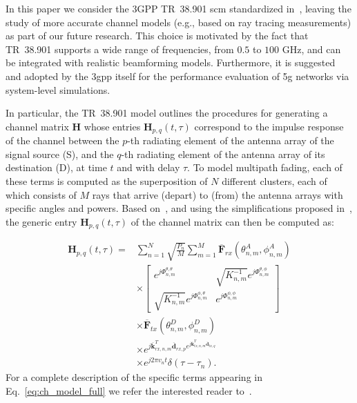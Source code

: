 In this paper we consider the 3GPP TR~38.901 \gls{scm} standardized in~\cite{3gpp.38.901}, leaving the study of more accurate channel models (e.g., based on ray tracing measurements) as part of our future research.
This choice is motivated by the fact that TR~38.901 supports a wide range of frequencies, from $0.5$ to $100$ GHz, and can be integrated with realistic beamforming models. Furthermore, it is suggested and adopted by the \gls{3gpp} itself for the performance evaluation of \gls{5g} networks via system-level simulations.

In particular, the TR~38.901 model outlines the procedures for generating a channel matrix $\bm{H}$ whose entries $\bm{H}_{p, q} (t, \tau)$ correspond to the impulse response of the channel between the $p$-th radiating element of the antenna array of the signal source (S), and the $q$-th radiating element of the antenna array of its destination (D), at time $t$ and with delay $\tau$. 
To model multipath fading, each of these terms is computed as the superposition of $N$ different clusters, each of which consists of $M$ rays that arrive (depart) to (from) the antenna arrays with specific angles and powers. Based on~\cite{3gpp.38.901}, and using the simplifications proposed in~\cite{zugno2020implementation}, the generic entry $\bm{H}_{p, q} (t, \tau)$ of the channel matrix can then be computed as:

\begin{equation}
\label{eq:ch_model_full}
\begin{aligned}
\bm{H}_{p, q}(t, \tau)=& \sum_{n=1}^{N} \sqrt{\frac{P_{n}}{M}} \sum_{m=1}^{M} \overline{\mathbf{F}}_{r x}\left(\theta_{n, m}^{A}, \phi_{n, m}^{A}\right) \\
& \times\left[\begin{array}{cr}
e^{j \Phi_{n, m}^{\theta, \theta}} & \sqrt{K_{n, m}^{-1}} e^{j \Phi_{n, m}^{\theta, \phi}} \\
\sqrt{K_{n, m}^{-1}} e^{j \Phi_{n, m}^{\phi, \theta}} & e^{j \Phi_{n, m}^{\phi, \phi}}
\end{array}\right] \\
& \times \overline{\mathbf{F}}_{tx}\left(\theta_{n, m}^{D}, \phi_{n, m}^{D}\right) \\
& \times e^{j \overline{\mathbf{k}}_{rx, n, m}^{T} \overline{\mathbf{d}}_{rx, p} e^{j \overline{\mathbf{k}}_{tx, n, m}^{T} \overline{\mathbf{d}}_{tx, q}}} \\
& \times e^{j 2 \pi v_{n} t} \delta\left(\tau-\tau_{n}\right).
\end{aligned}
\end{equation}
For a complete description of the specific terms appearing in Eq.~\eqref{eq:ch_model_full} we refer the interested reader to~\cite{zugno2020implementation}.

